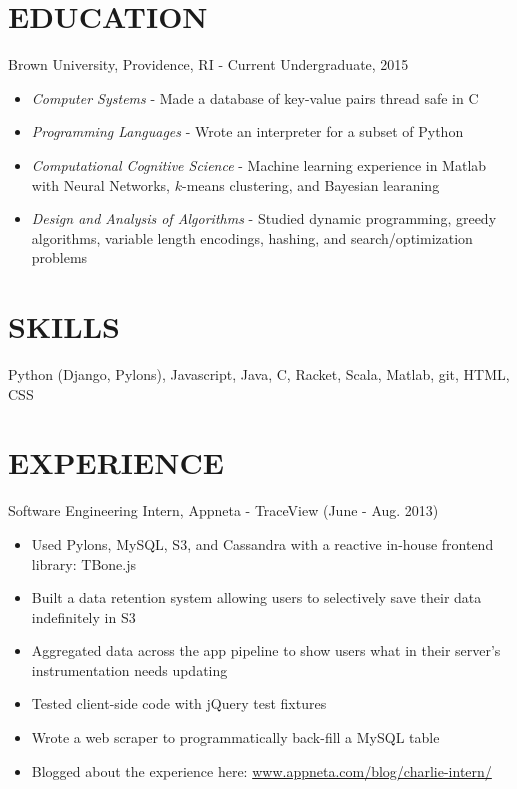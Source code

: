 \documentclass[11pt]{res} %
\begin{document}
\begin{resume}

\section{EDUCATION}
Brown University, Providence, RI - Current Undergraduate, 2015
\begin{itemize} \itemsep -2pt
  \item \emph{Computer Systems} - Made a database of key-value pairs thread safe in C
  \item \emph{Programming Languages} - Wrote an interpreter for a subset of Python
  \item \emph{Computational Cognitive Science} - Machine learning experience in Matlab with Neural Networks, $k$-means clustering, and Bayesian learaning
  \item \emph{Design and Analysis of Algorithms} - Studied dynamic programming, greedy algorithms, variable length encodings, hashing,  and search/optimization problems
\end{itemize}

 \section{SKILLS}
  Python (Django, Pylons), Javascript, Java, C, Racket, Scala, Matlab, git, HTML, CSS

\section{EXPERIENCE}
Software Engineering Intern, 
Appneta - TraceView 
(June - Aug. 2013)
\vspace{0.02in}
   \begin{itemize} \itemsep -2pt
   \item Used Pylons, MySQL, S3, and Cassandra with a reactive in-house frontend library: TBone.js
   \item Built a data retention system allowing users to selectively save their data indefinitely in S3
   \item Aggregated data across the app pipeline to show users what in their server's instrumentation needs updating 
   \item Tested client-side code with jQuery test fixtures
   \item Wrote a web scraper to programmatically back-fill a MySQL table
   \item Blogged about the experience here: \href{http://www.appneta.com/blog/charlie-intern/}{www.appneta.com/blog/charlie-intern/}
   \end{itemize}


\end{resume}
\end{document}
